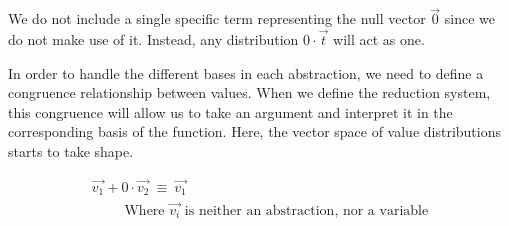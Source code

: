 \begin{remark}
  We do not include a single specific term representing the null vector $\vec{0}$ since we do not make use of it. Instead, any distribution $0\cdot\vec{t}$ will act as one. 
\end{remark}

In order to handle the different bases in each abstraction, we need to define a congruence relationship between values. When we define the reduction system, this congruence will allow us to take an argument and interpret it in the corresponding basis of the function. Here, the vector space of value distributions starts to take shape.

\begin{table*}[tb]
  \small
  \vspace*{0.2cm}
  \[
    \begin{array}{l}
      \vec{v_1} + 0\cdot \vec{v_2}~\equiv~\vec{v_1}\\  
      \qquad\text{ Where $\vec{v_i}$ is neither an abstraction, nor a variable}
    \end{array}   
  \]
  

\end{table*}
